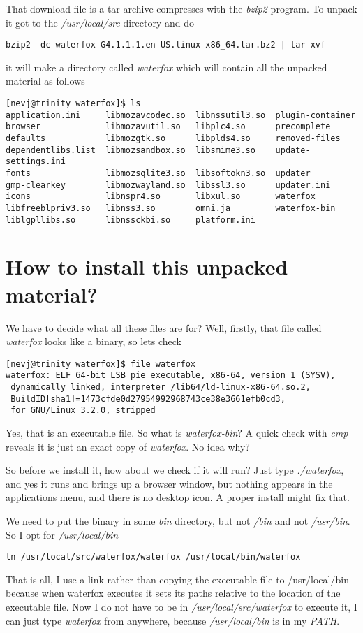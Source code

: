 \documentclass{article}  %
\begin{document}
That download file is a tar archive compresses with the {\em bzip2} program. To unpack it  got to the {\em /usr/local/src} directory and do 
\begin{verbatim}
bzip2 -dc waterfox-G4.1.1.1.en-US.linux-x86_64.tar.bz2 | tar xvf -
\end{verbatim}
it will make a directory called {\em waterfox} which will contain all the unpacked material as follows
\begin{verbatim}
[nevj@trinity waterfox]$ ls
application.ini     libmozavcodec.so  libnssutil3.so  plugin-container
browser             libmozavutil.so   libplc4.so      precomplete
defaults            libmozgtk.so      libplds4.so     removed-files
dependentlibs.list  libmozsandbox.so  libsmime3.so    update-settings.ini
fonts               libmozsqlite3.so  libsoftokn3.so  updater
gmp-clearkey        libmozwayland.so  libssl3.so      updater.ini
icons               libnspr4.so       libxul.so       waterfox
libfreeblpriv3.so   libnss3.so        omni.ja         waterfox-bin
liblgpllibs.so      libnssckbi.so     platform.ini
\end{verbatim}

\section{How to install this unpacked material?}
We have to decide what all these files are for? Well, firstly, that file called {\em waterfox} looks like a binary, so lets check
\begin{verbatim}
[nevj@trinity waterfox]$ file waterfox
waterfox: ELF 64-bit LSB pie executable, x86-64, version 1 (SYSV),
 dynamically linked, interpreter /lib64/ld-linux-x86-64.so.2,
 BuildID[sha1]=1473cfde0d27954992968743ce38e3661efb0cd3,
 for GNU/Linux 3.2.0, stripped
\end{verbatim}
Yes, that is an executable file. So what is {\em  waterfox-bin}?  A quick check with {\em cmp} reveals it is just an exact copy of {\em waterfox}.  No idea why?

So before we install it, how about we check if it will run? Just type {\em ./waterfox}, and yes it runs and brings up a browser window, but nothing appears in the applications menu, and there is no desktop icon.  A proper install might fix that. 

We need to put the binary in some {\em bin} directory, but not {\em /bin} and not {\em /usr/bin}. So I opt for {\em /usr/local/bin}
\begin{verbatim}
ln /usr/local/src/waterfox/waterfox /usr/local/bin/waterfox
\end{verbatim}
That is all, I use a link rather than copying the executable file to /usr/local/bin because when waterfox executes it sets its paths relative to the location of the executable file.  Now I do not have to be in {\em /usr/local/src/waterfox} to execute it, I can just type {\em waterfox} from anywhere, because {\em /usr/local/bin} is in my {\em PATH}. 
\end{document}
